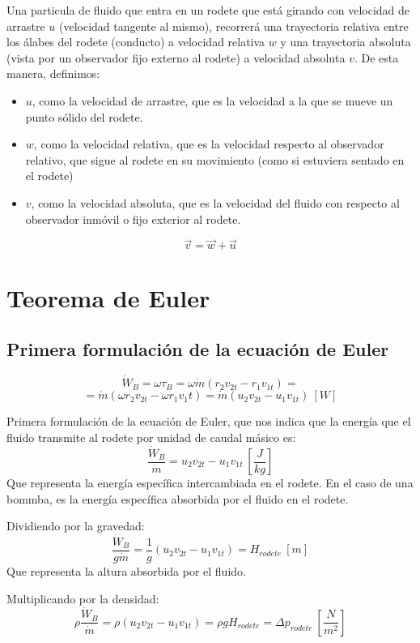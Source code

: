 Una particula de fluido que entra en un rodete que está girando con velocidad de arrastre $u$ (velocidad tangente al mismo), recorrerá una trayectoria relativa entre los álabes del rodete (conducto) a velocidad relativa $w$ y una trayectoria absoluta (vista por un observador fijo externo al rodete) a velocidad absoluta $v$. De esta manera, definimos:

\begin{itemize}
    \item $u$, como la velocidad de arrastre, que es la velocidad a la que se mueve un punto sólido del rodete.
    \item $w$, como la velocidad relativa, que es la velocidad respecto al observador relativo, que sigue al rodete en su movimiento (como si estuviera sentado en el rodete)
    \item $v$, como la velocidad absoluta, que es la velocidad del fluido con respecto al observador inmóvil o fijo exterior al rodete.
\end{itemize}

\[ \vec{v} = \vec{w} + \vec{u} \]

\section{Teorema de Euler}

\subsection{Primera formulación de la ecuación de Euler}
\[ \dot{W}_B =  \omega \tau_B = \omega \dot{m} (r_2 v_{2t} - r_1 v_{1t}) = \]
\[ = \dot{m} (\omega r_2 v_{2t} - \omega r_1 v_1t) = \dot{m} (u_2 v_{2t} - u_1 v_{1t})\ [W] \]

Primera formulación de la ecuación de Euler, que nos indica que la energía que el fluido transmite al rodete por unidad de caudal másico es:
\[ \frac{\dot{W}_B}{\dot{m}} = u_2 v_{2t} - u_1 v_{1t} \ \left[\frac{J}{kg}\right] \]
Que representa la energía específica intercambiada en el rodete. En el caso de una bommba, es la energía específica absorbida por el fluido en el rodete.

Dividiendo por la gravedad:
\[ \frac{\dot{W}_B}{g \dot{m}} = \frac{1}{g} (u_2 v_{2t} - u_1 v_{1t}) = H_{rodete} \ [m] \]
Que representa la altura absorbida por el fluido.

Multiplicando por la densidad:
\[ \rho \frac{\dot{W}_B}{\dot{m}} = \rho (u_2 v_{2t} - u_1 v_{1t}) =  \rho g H_{rodete} = \Delta p_{rodete} \ \left[ \frac{N}{m^2} \right] \]

